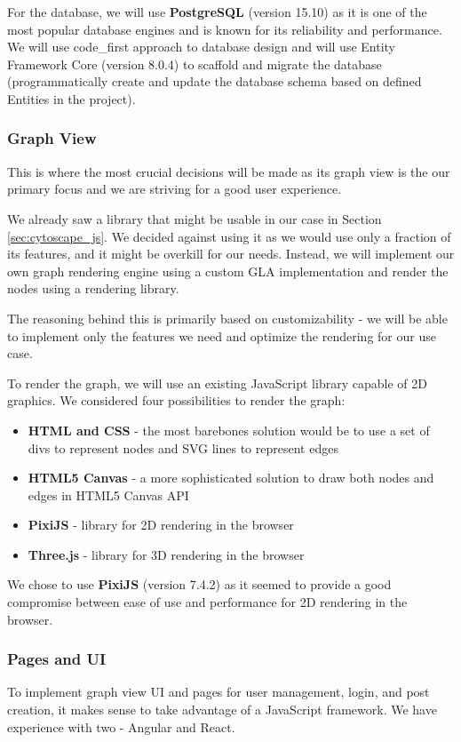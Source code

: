 For the database, we will use \textbf{PostgreSQL} (version 15.10) as it is one of the most popular database engines and is known for its reliability and performance.
We will use \gls{code_first} approach to database design and will use Entity Framework Core (version 8.0.4) to scaffold and migrate the database
(programmatically create and update the database schema based on defined Entities in the project).

\subsubsection{Graph View}
This is where the most crucial decisions will be made as its graph view is the our primary focus and we are striving for a good user experience.

We already saw a library that might be usable in our case in Section \ref{sec:cytoscape_js}.
We decided against using it as we would use only a fraction of its features, and it might be overkill for our needs.
Instead, we will implement our own graph rendering engine using a custom \gls{GLA}
implementation and render the nodes using a rendering library.

The reasoning behind this is primarily based on customizability
- we will be able to implement only the features we need and optimize the rendering for our use case.

To render the graph, we will use an existing JavaScript library capable of 2D graphics.
We considered four possibilities to render the graph:
\begin{itemize}
    \item \textbf{HTML and CSS} - the most barebones solution would be to use a set of divs to represent nodes and SVG lines to represent edges
    \item \textbf{HTML5 Canvas} - a more sophisticated solution to draw both nodes and edges in HTML5 Canvas API
    \item \textbf{PixiJS} - library for 2D rendering in the browser
    \item \textbf{Three.js} - library for 3D rendering in the browser
\end{itemize}

We chose to use \textbf{PixiJS} (version 7.4.2) as it seemed to provide a good compromise between ease of use and performance for 2D rendering in the browser.

\subsubsection{Pages and UI}
To implement graph view UI and pages for user management, login, and post creation, it makes sense to take advantage of a JavaScript framework.
We have experience with two - Angular and React.

